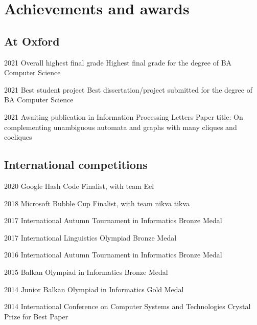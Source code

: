 \documentclass{tccv}
\begin{document}

\section{Achievements and awards}

\subsection{At Oxford}

\begin{yearlist}

\item{2021}
     {Overall highest final grade}
     {Highest final grade for the degree of BA Computer Science}

\item{2021}
     {Best student project}
     {Best dissertation/project submitted for the degree of BA Computer Science}

\item{2021}
     {Awaiting publication in Information Processing Letters}
     {Paper title: On complementing unambiguous automata
     and graphs with many cliques and cocliques}

\end{yearlist}

\subsection{International competitions}

\begin{yearlist}

\item{2020}
     {Google Hash Code}
     {Finalist, with team Eel}

\item{2018}
     {Microsoft Bubble Cup}
     {Finalist, with team nikva tikva}

\item{2017}
     {International Autumn Tournament in Informatics}
     {Bronze Medal}

\item{2017}
     {International Linguistics Olympiad}
     {Bronze Medal}

\item{2016}
     {International Autumn Tournament in Informatics}
     {Bronze Medal}

\item{2015}
     {Balkan Olympiad in Informatics}
     {Bronze Medal}

\item{2014}
     {Junior Balkan Olympiad in Informatics}
     {Gold Medal}

\item{2014}
     {International Conference on Computer Systems and Technologies}
     {Crystal Prize for Best Paper}

\end{yearlist}
\end{document}
